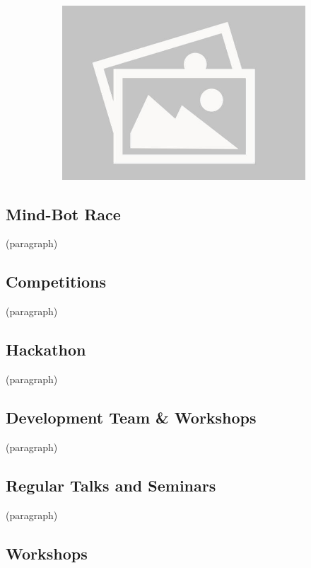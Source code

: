 \documentclass[a4paper,12pt]{report}
\begin{document}
\begin{figure}[H]
\begin{subfigure}{0.32\linewidth}
    \end{subfigure}
    \begin{subfigure}{0.32\linewidth}
        \includegraphics[width=0.99\linewidth]{./photos/placeholder.jpg}
    \end{subfigure}
\end{figure}

\subsection*{Mind-Bot Race}
(paragraph)

\subsection*{Competitions}
(paragraph)

\subsection*{Hackathon}
(paragraph)

\subsection*{Development Team \& Workshops}
(paragraph)

\subsection*{Regular Talks and Seminars} 
(paragraph)

\newpage

\subsection*{Workshops}
\end{document}
